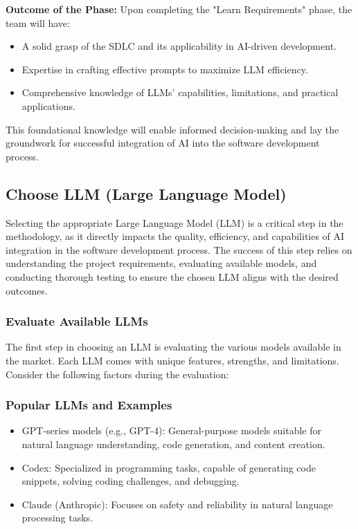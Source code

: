 \documentclass[14pt, a4paper]{article}
\begin{document}
\textbf{Outcome of the Phase:} Upon completing the "Learn Requirements" phase,
the team will have:

\begin{itemize}
    \item A solid grasp of the SDLC and its applicability in AI-driven development.
    \item Expertise in crafting effective prompts to maximize LLM efficiency.
    \item Comprehensive knowledge of LLMs’ capabilities, limitations, and practical
    applications.
\end{itemize}

This foundational knowledge will enable informed decision-making and lay the
groundwork for successful integration of AI into the software development
process.

\subsection{Choose LLM (Large Language Model)}

Selecting the appropriate Large Language Model (LLM) is a critical step in the
methodology, as it directly impacts the quality, efficiency, and capabilities of
AI integration in the software development process. The success of this step
relies on understanding the project requirements, evaluating available models,
and conducting thorough testing to ensure the chosen LLM aligns with the desired
outcomes.

\subsubsection{Evaluate Available LLMs}

The first step in choosing an LLM is evaluating the various models available in
the market. Each LLM comes with unique features, strengths, and limitations.
Consider the following factors during the evaluation:

\subsubsection*{Popular LLMs and Examples}

\begin{itemize}
    \item GPT-series models (e.g., GPT-4): General-purpose models suitable for
    natural language understanding, code generation, and content creation.
    \item Codex: Specialized in programming tasks, capable of generating code
    snippets, solving coding challenges, and debugging.
    \item Claude (Anthropic): Focuses on safety and reliability in natural
    language processing tasks.
\end{itemize}
\end{document}
